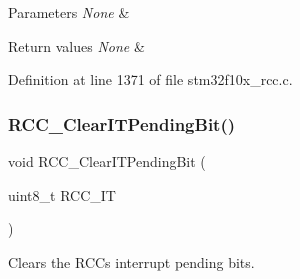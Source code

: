 \begin{DoxyParams}{Parameters}
{\em None} & \\
\hline
\end{DoxyParams}

\begin{DoxyRetVals}{Return values}
{\em None} & \\
\hline
\end{DoxyRetVals}


Definition at line 1371 of file stm32f10x\+\_\+rcc.\+c.

\mbox{\label{group___r_c_c___exported___functions_ga529842d165910f8f87e26115da36089b}} 
\subsubsection{\texorpdfstring{R\+C\+C\+\_\+\+Clear\+I\+T\+Pending\+Bit()}{RCC\_ClearITPendingBit()}}
{\footnotesize\ttfamily void R\+C\+C\+\_\+\+Clear\+I\+T\+Pending\+Bit (\begin{DoxyParamCaption}\item[{uint8\+\_\+t}]{R\+C\+C\+\_\+\+IT }\end{DoxyParamCaption})}



Clears the R\+CC\textquotesingle{}s interrupt pending bits. 


